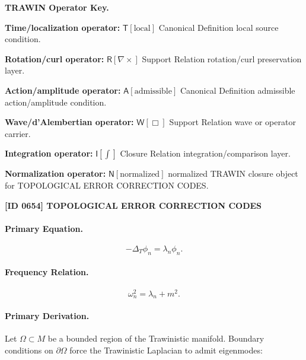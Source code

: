 \par\vspace{0.45\baselineskip}
\noindent\begin{minipage}[t]{\linewidth}
\begingroup
\small
\raggedright
\textbf{TRAWIN Operator Key.}\par
\noindent\textbf{Time/localization operator:} $\mathsf{T}\!\left[\mathrm{local}\right]$ Canonical Definition local source condition.\par
\noindent\textbf{Rotation/curl operator:} $\mathsf{R}\!\left[\nabla\times\right]$ Support Relation rotation/curl preservation layer.\par
\noindent\textbf{Action/amplitude operator:} $\mathsf{A}\!\left[\mathrm{admissible}\right]$ Canonical Definition admissible action/amplitude condition.\par
\noindent\textbf{Wave/d'Alembertian operator:} $\mathsf{W}\!\left[\Box\right]$ Support Relation wave or operator carrier.\par
\noindent\textbf{Integration operator:} $\mathsf{I}\!\left[\int\right]$ Closure Relation integration/comparison layer.\par
\noindent\textbf{Normalization operator:} $\mathsf{N}\!\left[\mathrm{normalized}\right]$ normalized TRAWIN closure object for TOPOLOGICAL ERROR CORRECTION CODES.\par
\endgroup
\end{minipage}

\clearpage
\noindent\textbf{[ID 0654] TOPOLOGICAL ERROR CORRECTION CODES}\par
\vspace{0.35em}
\paragraph{Primary Equation.}
\begin{equation}
-\Delta_T \phi_n = \lambda_n \phi_n .
\end{equation}

\paragraph{Frequency Relation.}
\begin{equation}
\omega_n^2 = \lambda_n + m^2 .
\end{equation}

\paragraph{Primary Derivation.}
Let $\Omega\subset M$ be a bounded region of the Trawinistic manifold.  
Boundary conditions on $\partial\Omega$ force the Trawinistic Laplacian to admit eigenmodes:

